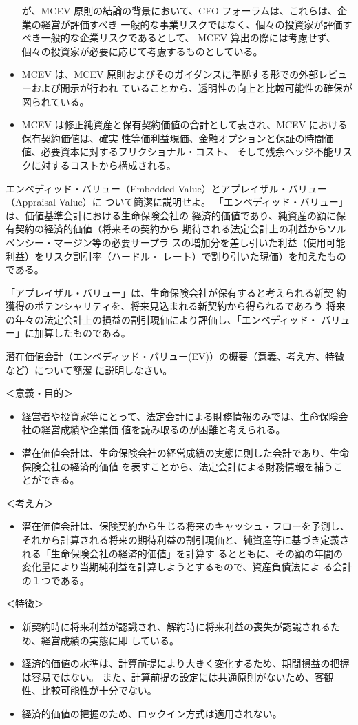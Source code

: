 \documentclass[report,gutter=10mm,fore-edge=10mm,uplatex,dvipdfmx]{jlreq}
\begin{document}
\begin{itemize}
が、MCEV 原則の結論の背景において、CFO フォーラムは、これらは、企業の経営が評価すべき
一般的な事業リスクではなく、個々の投資家が評価すべき一般的な企業リスクであるとして、
MCEV 算出の際には考慮せず、個々の投資家が必要に応じて考慮するものとしている。
\item[] MCEV は、MCEV 原則およびそのガイダンスに準拠する形での外部レビューおよび開示が行われ
ていることから、透明性の向上と比較可能性の確保が図られている。
\item[] MCEV は修正純資産と保有契約価値の合計として表され、MCEV における保有契約価値は、確実
性等価利益現価、金融オプションと保証の時間価値、必要資本に対するフリクショナル・コスト、
そして残余ヘッジ不能リスクに対するコストから構成される。
\end{itemize}

エンベディッド・バリュー（Embedded Value）とアプレイザル・バリュー（Appraisal Value）に
ついて簡潔に説明せよ。
\answer{}
「エンベディッド・バリュー」は、価値基準会計における生命保険会社の
経済的価値であり、純資産の額に保有契約の経済的価値（将来その契約から
期待される法定会計上の利益からソルベンシー・マージン等の必要サープラ
スの増加分を差し引いた利益（使用可能利益）をリスク割引率（ハードル・
レート）で割り引いた現価）を加えたものである。

「アプレイザル・バリュー」は、生命保険会社が保有すると考えられる新契
約獲得のポテンシャリティを、将来見込まれる新契約から得られるであろう
将来の年々の法定会計上の損益の割引現価により評価し、「エンベディッド・
バリュー」に加算したものである。

潜在価値会計（エンベディッド・バリュー(EV)）の概要（意義、考え方、特徴など）について簡潔
に説明しなさい。

\answer{}
＜意義・目的＞
\begin{itemize}
 \item[] 経営者や投資家等にとって、法定会計による財務情報のみでは、生命保険会社の経営成績や企業価 値を読み取るのが困難と考えられる。
 \item[] 潜在価値会計は、生命保険会社の経営成績の実態に則した会計であり、生命保険会社の経済的価値 を表すことから、法定会計による財務情報を補うことができる。
\end{itemize}
＜考え方＞
\begin{itemize}
 \item[] 潜在価値会計は、保険契約から生じる将来のキャッシュ・フローを予測し、それから計算される将来の期待利益の割引現価と、純資産等に基づき定義される「生命保険会社の経済的価値」を計算す
 るとともに、その額の年間の変化量により当期純利益を計算しようとするもので、資産負債法によ
 る会計の１つである。
\end{itemize}
＜特徴＞
\begin{itemize}
 \item[] 新契約時に将来利益が認識され、解約時に将来利益の喪失が認識されるため、経営成績の実態に即 している。
 \item[] 経済的価値の水準は、計算前提により大きく変化するため、期間損益の把握は容易ではない。
また、計算前提の設定には共通原則がないため、客観性、比較可能性が十分でない。
 \item[] 経済的価値の把握のため、ロックイン方式は適用されない。
\end{itemize}
\end{document}
